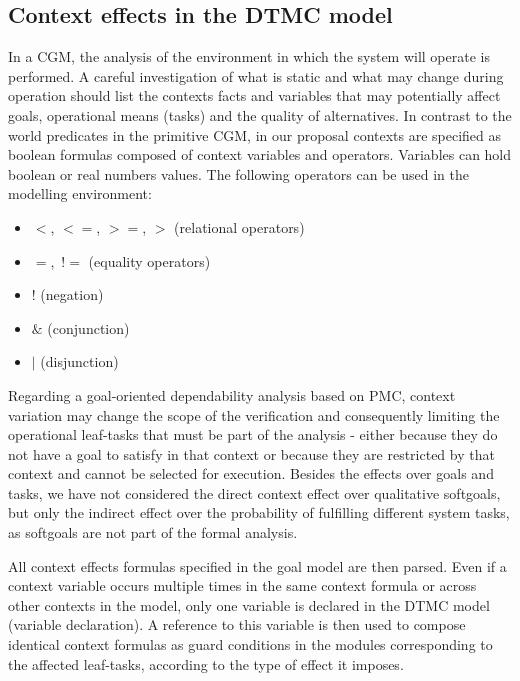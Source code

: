 \subsection{Context effects in the DTMC model}

In a CGM, the analysis of the environment in which the system will operate is performed. A careful investigation of what is static and what may change during operation should list the contexts facts and variables that may potentially affect goals, operational means (tasks) and the quality of alternatives. In contrast to the world predicates in the primitive CGM, in our proposal contexts are specified as boolean formulas composed of context variables and operators. Variables can hold boolean or real numbers values. The following operators can be used in the modelling environment:

\begin{itemize}

\item $<$, $<=$, $>=$, $>$ (relational operators)
\item $=$,\ $!=$ (equality operators)
\item $!$ (negation)
\item $\&$ (conjunction)
\item $|$ (disjunction)

\end{itemize} 

Regarding a goal-oriented dependability analysis based on PMC, context variation may change the scope of the verification and consequently limiting the operational leaf-tasks that must be part of the analysis - either because they do not have a goal to satisfy in that context or because they are restricted by that context and cannot be selected for execution. Besides the effects over goals and tasks, we have not considered the direct context effect over qualitative softgoals, but only the indirect effect over the probability of fulfilling different system tasks, as softgoals are not part of the formal analysis.

All context effects formulas specified in the goal model are then parsed. Even if a context variable occurs multiple times in the same context formula or across other contexts in the model, only one variable is declared in the DTMC model (variable declaration). A reference to this variable is then used to compose identical context formulas as guard conditions in the modules corresponding to the affected leaf-tasks, according to the type of effect it imposes.

